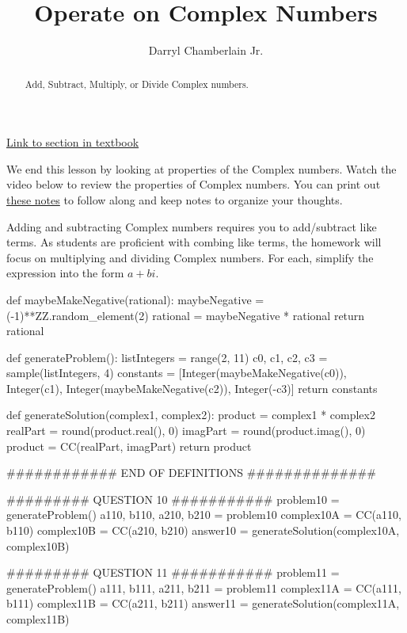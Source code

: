 \documentclass{ximera}
\author{Darryl Chamberlain Jr.}
\title{Operate on Complex Numbers}
\begin{document}
\begin{abstract}
Add, Subtract, Multiply, or Divide Complex numbers.
\end{abstract}
\maketitle

\href{https://cnx.org/contents/mwjClAV_@8.1:Sqk1HAGf@9/Complex-Numbers}{Link to section in textbook}


We end this lesson by looking at properties of the Complex numbers. Watch the video below to review the properties of Complex numbers. You can print out \href{http://people.clas.ufl.edu/dchamberlain31/files/Objective-4-Operate-on-Complex-Numbers.pdf}{these notes} to follow along and keep notes to organize your thoughts.


Adding and subtracting Complex numbers requires you to add/subtract like terms. As students are proficient with combing like terms, the homework will focus on multiplying and dividing Complex numbers. For each, simplify the expression into the form $a+bi$.

\begin{sagesilent}
def maybeMakeNegative(rational):
    maybeNegative = (-1)**ZZ.random_element(2)
    rational = maybeNegative * rational
    return rational

def generateProblem():
    listIntegers = range(2, 11)
    c0, c1, c2, c3 = sample(listIntegers, 4)
    constants = [Integer(maybeMakeNegative(c0)), Integer(c1), Integer(maybeMakeNegative(c2)), Integer(-c3)]
    return constants

def generateSolution(complex1, complex2):
    product = complex1 * complex2
    realPart = round(product.real(), 0)
    imagPart = round(product.imag(), 0)
    product = CC(realPart, imagPart)
    return product

############ END OF DEFINITIONS ##############

######### QUESTION 10 ###########
problem10 = generateProblem()
a110, b110, a210, b210 = problem10
complex10A = CC(a110, b110)
complex10B = CC(a210, b210)
answer10 = generateSolution(complex10A, complex10B)

######### QUESTION 11 ###########
problem11 = generateProblem()
a111, b111, a211, b211 = problem11
complex11A = CC(a111, b111)
complex11B = CC(a211, b211)
answer11 = generateSolution(complex11A, complex11B)
\end{sagesilent}
\end{document}
